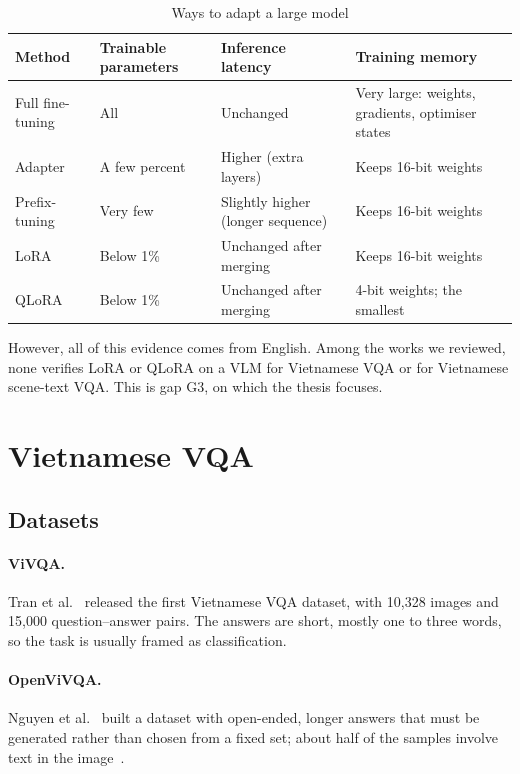 \begin{table}[htbp]
\caption{Ways to adapt a large model}
\label{tab:rel-peft}
\centering
\small
\begin{tabular}{p{}p{}p{}p{}}
\toprule
\textbf{Method} & \textbf{Trainable parameters} & \textbf{Inference latency} & \textbf{Training memory} \\
\midrule
Full fine-tuning & All & Unchanged & Very large: weights, gradients, optimiser states \\
Adapter & A few percent & Higher (extra layers) & Keeps 16-bit weights \\
Prefix-tuning & Very few & Slightly higher (longer sequence) & Keeps 16-bit weights \\
LoRA & Below 1\% & Unchanged after merging & Keeps 16-bit weights \\
QLoRA & Below 1\% & Unchanged after merging & 4-bit weights; the smallest \\
\bottomrule
\end{tabular}
\end{table}

However, all of this evidence comes from English. Among the works we reviewed,
none verifies LoRA or QLoRA on a VLM for Vietnamese VQA or for Vietnamese scene-text
VQA. This is gap G3, on which the thesis focuses.

\section{Vietnamese VQA}
\label{sec:rel-vivqa}

\subsection{Datasets}

\paragraph{ViVQA.} Tran et al.~\cite{tran2021vivqa} released the first Vietnamese VQA
dataset, with 10,328 images and 15,000 question--answer pairs. The answers are short,
mostly one to three words, so the task is usually framed as classification.

\paragraph{OpenViVQA.} Nguyen et al.~\cite{nguyen2023openvivqa} built a dataset with
open-ended, longer answers that must be generated rather than chosen from a fixed set;
about half of the samples involve text in the image~\cite{nguyen2024vitextvqa}.

